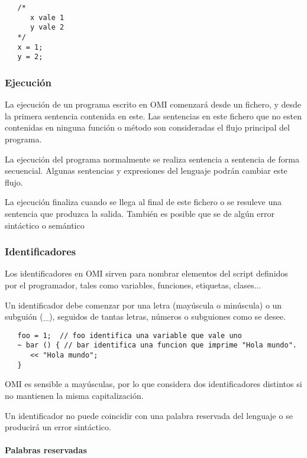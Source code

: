 \begin{lstlisting}
   /* 
      x vale 1
      y vale 2
   */
   x = 1; 
   y = 2; 
\end{lstlisting}
\subsubsection{Ejecución}\label{sec:execution}
La ejecución de un programa escrito en OMI comenzará desde un fichero, y desde la primera sentencia contenida en este. Las sentencias 
en este fichero que no esten contenidas en ninguna función o método son consideradas el flujo principal del programa.

La ejecución del programa normalmente se realiza sentencia a sentencia de forma secuencial. Algunas sentencias y expresiones del lenguaje podrán cambiar este flujo.

La ejecución finaliza cuando se llega al final de este fichero o se resuleve una sentencia que produzca la salida. También es posible que se de algún error sintáctico o semántico

\subsubsection{Identificadores}\label{sec:id}
Los identificadores en OMI sirven para nombrar elementos del script definidos por el programador,
tales como variables, funciones, etiquetas, clases...

Un identificador debe comenzar por una letra (mayúscula o minúscula) o un subguión (\_), seguidos de tantas letras, números o subguiones como se desee. \\

\begin{lstlisting}
   foo = 1;  // foo identifica una variable que vale uno
   ~ bar () { // bar identifica una funcion que imprime "Hola mundo".
      << "Hola mundo";
   } 
\end{lstlisting}

OMI es sensible a mayúsculas, por lo que considera dos identificadores distintos si no mantienen la misma capitalización.

Un identificador no puede coincidir con una palabra reservada del lenguaje o se producirá un error sintáctico.

\paragraph{Palabras reservadas}

